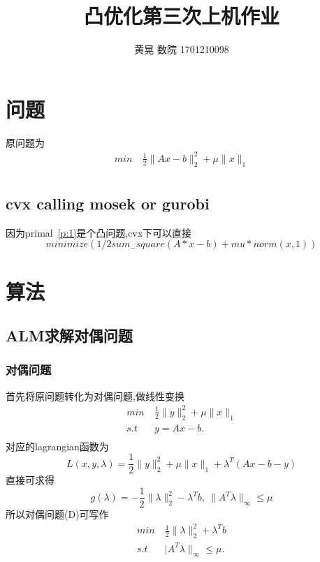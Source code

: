 \documentclass[UTF8]{ctexart}
\author{黄晃 数院 1701210098 }
\title{凸优化第三次上机作业}
\begin{document}
  \maketitle
  \section{问题}
  原问题为
  \begin{equation}\label{p:1}
    \begin{split}
       min\  & \frac{1}{2}\|Ax-b \|_{2}^{2} + \mu \|x\|_{1} \\
    \end{split}
  \end{equation}
  \subsection{cvx calling mosek or gurobi}
  因为primal~\ref{p:1}是个凸问题,cvx下可以直接
  $$minimize(1/2sum_{-}square(A*x-b)+mu*norm(x,1))$$


  \section{算法}
  \subsection{ALM求解对偶问题}
  \subsubsection{对偶问题}
  首先将原问题转化为对偶问题,做线性变换
    \begin{equation}
    \begin{split}
       min\  & \frac{1}{2}\|y\|_{2}^{2} + \mu \|x\|_{1} \\
       s.t \ & y=Ax-b.\\
    \end{split}
  \end{equation}
  对应的lagrangian函数为
$$
L(x,y,\lambda)=\frac{1}{2}\|y\|_{2}^{2} + \mu \|x\|_{1}+\lambda^{T}(Ax-b-y)
$$
直接可求得
$$
g(\lambda)= -\frac{1}{2}\|\lambda\|_{2}^{2} - \lambda^{T}b,\ \|A^{T}\lambda\|_{\infty}\leq \mu
$$
所以对偶问题(D)可写作
    \begin{equation}
    \begin{split}
       min\  & \frac{1}{2}\|\lambda\|_{2}^{2} + \lambda^{T}b \\
       s.t \ & |A^{T}\lambda\|_{\infty}\leq \mu.\\
    \end{split}
  \end{equation}
\end{document}
